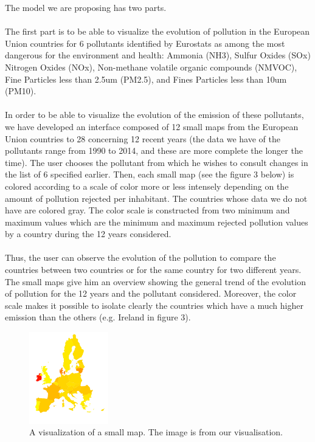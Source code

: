 \documentclass[preprint,journal]{vgtc}       %
\begin{document}
The model we are proposing has two parts.

\paragraph{}
The first part is to be able to visualize the evolution of pollution in the European Union countries for 6 pollutants identified by Eurostats as among the most dangerous for the environment and health: Ammonia (NH3), Sulfur Oxides (SOx) Nitrogen Oxides (NOx), Non-methane volatile organic compounds (NMVOC), Fine Particles less than 2.5um (PM2.5), and Fines Particles less than 10um (PM10).

\paragraph{}
In order to be able to visualize the evolution of the emission of these pollutants, we have developed an interface composed of 12 small maps from the European Union countries to 28 concerning 12 recent years (the data we have of the pollutants range from 1990 to 2014, and these are more complete the longer the time). The user chooses the pollutant from which he wishes to consult changes in the list of 6 specified earlier. Then, each small map (see the figure 3 below) is colored according to a scale of color more or less intensely depending on the amount of pollution rejected per inhabitant. The countries whose data we do not have are colored gray. The color scale is constructed from two minimum and maximum values ​​which are the minimum and maximum rejected pollution values ​​by a country during the 12 years considered.

\paragraph{}
Thus, the user can observe the evolution of the pollution to compare the countries between two countries or for the same country for two different years. The small maps give him an overview showing the general trend of the evolution of pollution for the 12 years and the pollutant considered. Moreover, the color scale makes it possible to isolate clearly the countries which have a much higher emission than the others (e.g. Ireland in figure 3).

\begin{figure}[H]
 \centering %
 \includegraphics[width=130px]{smallmap}
 \caption{A visualization of a small map. The image is from our visualisation.}
 \label{fig:smallmapammoniac}
\end{figure}
\end{document}
